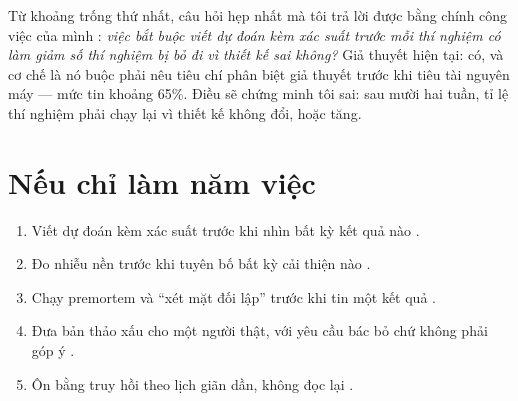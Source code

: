 \documentclass[hieu-suat.tex]{subfiles}
\begin{document}
Từ khoảng trống thứ nhất, câu hỏi hẹp nhất mà tôi trả lời được bằng chính công việc của mình \nM{}: \emph{việc bắt buộc viết dự đoán kèm xác suất trước mỗi thí nghiệm có làm giảm số thí nghiệm bị bỏ đi vì thiết kế sai không?} Giả thuyết hiện tại: có, và cơ chế là nó buộc phải nêu tiêu chí phân biệt giả thuyết trước khi tiêu tài nguyên máy --- mức tin khoảng 65\%. Điều sẽ chứng minh tôi sai: sau mười hai tuần, tỉ lệ thí nghiệm phải chạy lại vì thiết kế không đổi, hoặc tăng.

\section{Nếu chỉ làm năm việc}

\begin{enumerate}
\item Viết dự đoán kèm xác suất trước khi nhìn bất kỳ kết quả nào \cite{mellers2015}.
\item Đo nhiễu nền trước khi tuyên bố bất kỳ cải thiện nào \cite{bouthillier2021}.
\item Chạy premortem và ``xét mặt đối lập'' trước khi tin một kết quả \cite{lord1984,mitchell1989}.
\item Đưa bản thảo xấu cho một người thật, với yêu cầu bác bỏ chứ không phải góp ý \cite{mercier2011,dunbar1997}.
\item Ôn bằng truy hồi theo lịch giãn dần, không đọc lại \cite{karpicke2008,cepeda2006}.
\end{enumerate}
\end{document}
